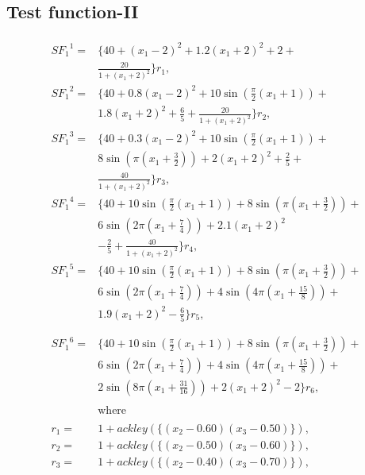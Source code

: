 \subsection{Test function-II}
{\small
	\begin{align*}
		\begin{split} 
			{SF_1}^1 ={} &\{40+(x_1 - 2)^2 + 1.2(x_1 + 2)^2 + 2 + \\ 
			&\frac{20}{1 +(x_1 + 2)^2}\}r_1,\\ 
			{SF_1}^2 ={} &\{40+0.8(x_1 - 2)^2 + 10\sin(\frac{\pi}{2}(x_1 + 1)) +\\ 
			& 1.8(x_1 + 2)^2 + \frac{6}{5} + \frac{20}{1 + (x_1 + 2)^2}\}r_2,\\
			{SF_1}^3 ={} &\{40+0.3(x_1 - 2)^2 + 10\sin(\frac{\pi}{2}(x_1 + 1)) +\\ 
			& 8\sin(\pi(x_1 + \frac{3}{2})) + 2(x_1 + 2)^2 + \frac{2}{5} +\\ 
			&\frac{40}{1 + (x_1 + 2)^2}\}r_3,\\ 
			{SF_1}^4 ={} &\{40+10\sin(\frac{\pi}{2}(x_1 + 1)) + 8\sin(\pi(x_1 + \frac{3}{2})) +\\ 
			& 6\sin(2\pi(x_1 + \frac{7}{4})) + 2.1(x_1 + 2)^2 \\
			&- \frac{2}{5} + \frac{40}{1 + (x_1 + 2)^2}\}r_4,\\
			{SF_1}^5 ={} &\{40+10\sin(\frac{\pi}{2}(x_1 + 1)) + 8\sin(\pi(x_1 + \frac{3}{2})) +\\ 
			& 6\sin(2\pi(x_1 + \frac{7}{4})) + 4\sin(4\pi(x_1 + \frac{15}{8})) +\\ 
			&1.9(x_1 + 2)^2 - \frac{6}{5}\}r_5,\\
		\end{split}
	\end{align*}
	\begin{align}
		\begin{split}
			{SF_1}^6 ={} &\{40+10\sin(\frac{\pi}{2}(x_1 + 1)) + 8\sin(\pi(x_1 + \frac{3}{2})) +\\ 
			& 6\sin(2\pi(x_1 + \frac{7}{4})) + 4\sin(4\pi(x_1 + \frac{15}{8})) +\\ 
			&2\sin(8\pi(x_1 + \frac{31}{16})) + 2(x_1 + 2)^2 - 2\}r_6,\\\\
			& \text{where}\\\\
			r_1 ={} &1 + ackley(\{(x_2 - 0.60) (x_3 - 0.50)\}),\\
			r_2 ={} &1 + ackley(\{(x_2 - 0.50) (x_3 - 0.60)\}),\\
			r_3 ={} &1 + ackley(\{(x_2 - 0.40) (x_3 - 0.70)\}),\\

\end{split}
\end{align}}
